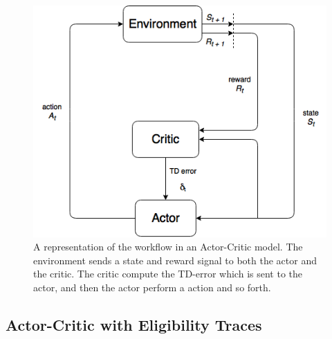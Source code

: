 \documentclass[11pt]{article}
\begin{document}
\begin{figure}[!h]
    \centering
    \includegraphics[scale = 0.5]{include/ActorCriticDiagram.png}
    \caption{A representation of the workflow in an Actor-Critic
    model. The environment sends a state and reward signal to both the actor and the critic. The critic compute the TD-error which is sent to the actor,
and then the actor perform a action and so forth.}
    \label{fig:actor-critic}
\end{figure}


\subsection{Actor-Critic with Eligibility Traces}
\end{document}
